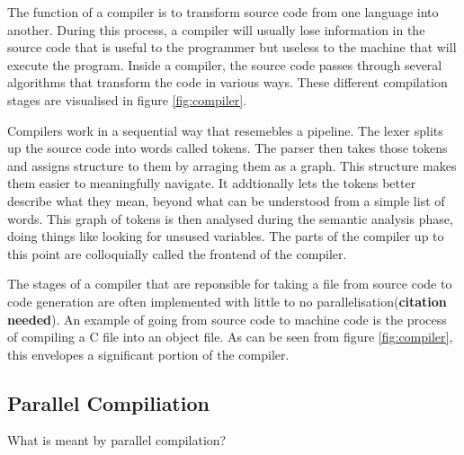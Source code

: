The function of a compiler is to transform source code from one language into
another. During this process, a compiler will usually lose information in the
source code that is useful to the programmer but useless to the machine that
will execute the program. Inside a compiler, the source code passes through
several algorithms that transform the code in various ways. These different
compilation stages are visualised in figure \ref{fig:compiler}.

Compilers work in a sequential way that resemebles a pipeline. The lexer splits
up the source code into words called tokens. The parser then takes those tokens
and assigns structure to them by arraging them as a graph. This structure makes
them easier to meaningfully navigate. It addtionally lets the tokens better describe
what they mean, beyond what can be understood from a simple list of words. This
graph of tokens is then analysed during the semantic analysis phase, doing
things like looking for unsused variables. The parts of the compiler up to this
point are colloquially called the frontend of the compiler.

The stages of a compiler that are reponsible for taking a file from
source code to code generation are often implemented with little to no
parallelisation(\textbf{citation needed}). An example of going from source
code to machine code is the process of compiling a C file into an object file.
As can be seen from figure \ref{fig:compiler}, this envelopes a significant
portion of the compiler. 

\subsection{Parallel Compiliation}
\begin{sectionplan}
	What is meant by parallel compilation?
\end{sectionplan}


